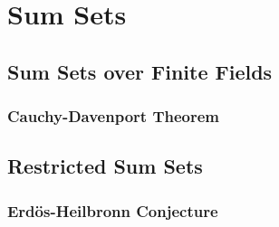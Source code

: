 \section{Sum Sets}
\subsection{Sum Sets over Finite Fields} 
\subsubsection{Cauchy-Davenport Theorem}
\subsection{Restricted Sum Sets}
\subsubsection{Erd\"{o}s-Heilbronn Conjecture}